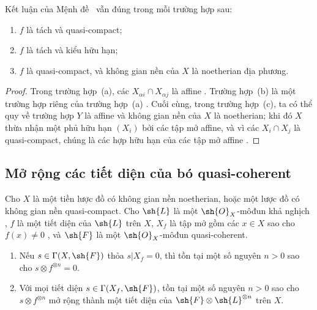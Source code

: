 \documentclass[oneside]{amsart}
\let\EGAOriginalLabel\label
\renewcommand{\label}[1]{\phantomsection\EGAOriginalLabel{#1}}
\begin{document}
\begin{corollary}[9.2.2]
\label{I.9.2.2}
Kết luận của Mệnh đề~ vẫn đúng trong mỗi trường hợp sau:
\begin{enumerate}
  \item[{\rm(a)}] $f$ là tách và quasi-compact;
  \item[{\rm(b)}] $f$ là tách và kiểu hữu hạn;
  \item[{\rm(c)}] $f$ là quasi-compact, và không gian nền của $X$ là noetherian địa phương.
\end{enumerate}
\end{corollary}

\begin{proof}
Trong trường hợp~(a), các $X_{\alpha i}\cap X_{\alpha j}$ là affine .
Trường hợp~(b) là một trường hợp riêng của trường hợp~(a) . Cuối cùng, trong trường hợp~(c), ta có thể quy về trường hợp $Y$ là affine và không gian nền của $X$ là noetherian; khi đó $X$ thừa nhận một phủ hữu hạn $(X_i)$ bởi các tập mở affine, và vì các $X_i\cap X_j$ là quasi-compact, chúng là các hợp hữu hạn của các tập mở affine .
\end{proof}

\subsection{Mở rộng các tiết diện của bó quasi-coherent}
\label{subsection:I.9.3}

\begin{theorem}[9.3.1]
\label{I.9.3.1}
Cho $X$ là một tiền lược đồ có không gian nền noetherian, hoặc một lược đồ có không gian
nền quasi-compact. Cho $\sh{L}$ là một $\sh{O}_X$-môđun khả nghịch , $f$ là một
tiết diện của $\sh{L}$ trên $X$, $X_f$ là tập mở gồm các $x\in X$ sao cho $f(x)\neq0$
, và $\sh{F}$ là một $\sh{O}_X$-môđun quasi-coherent.
\begin{enumerate}
  \item[{\rm(i)}] Nếu $s\in\Gamma(X,\sh{F})$ thỏa $s|X_f=0$, thì tồn tại một số nguyên $n>0$ sao cho $s\otimes f^{\otimes n}=0$.
  \item[{\rm(ii)}] Với mọi tiết diện $s\in\Gamma(X_f,\sh{F})$, tồn tại một số nguyên $n>0$ sao cho $s\otimes f^{\otimes n}$ mở rộng thành một tiết diện của $\sh{F}\otimes\sh{L}^{\otimes n}$ trên $X$.
\end{enumerate}
\end{theorem}
\end{document}
